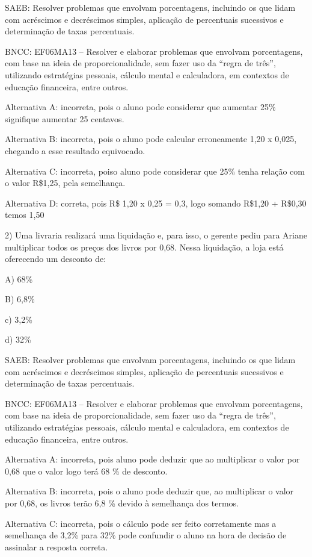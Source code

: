SAEB: Resolver problemas que envolvam porcentagens, incluindo os que
lidam com acréscimos e decréscimos simples, aplicação de percentuais
sucessivos e determinação de taxas percentuais.

BNCC: EF06MA13 -- Resolver e elaborar problemas que envolvam
porcentagens, com base na ideia de proporcionalidade, sem fazer uso da
``regra de três'', utilizando estratégias pessoais, cálculo mental e
calculadora, em contextos de educação financeira, entre outros.

Alternativa A: incorreta, pois o aluno pode considerar que aumentar 25\%
signifique aumentar 25 centavos.

Alternativa B: incorreta, pois o aluno pode calcular erroneamente 1,20 x
0,025, chegando a esse resultado equivocado.

Alternativa C: incorreta, poiso aluno pode considerar que 25\% tenha
relação com o valor R\$1,25, pela semelhança.

Alternativa D: correta, pois R\$ 1,20 x 0,25 = 0,3, logo somando R\$1,20
+ R\$0,30 temos 1,50

2) Uma livraria realizará uma liquidação e, para isso, o gerente pediu
para Ariane multiplicar todos os preços dos livros por 0,68. Nessa
liquidação, a loja está oferecendo um desconto de:

A) 68\%

B) 6,8\%

c) 3,2\%

d) 32\%

SAEB: Resolver problemas que envolvam porcentagens, incluindo os que
lidam com acréscimos e decréscimos simples, aplicação de percentuais
sucessivos e determinação de taxas percentuais.

BNCC: EF06MA13 -- Resolver e elaborar problemas que envolvam
porcentagens, com base na ideia de proporcionalidade, sem fazer uso da
``regra de três'', utilizando estratégias pessoais, cálculo mental e
calculadora, em contextos de educação financeira, entre outros.

Alternativa A: incorreta, pois aluno pode deduzir que ao multiplicar o
valor por 0,68 que o valor logo terá 68 \% de desconto.

Alternativa B: incorreta, pois o aluno pode deduzir que, ao multiplicar
o valor por 0,68, os livros terão 6,8 \% devido à semelhança dos termos.

Alternativa C: incorreta, pois o cálculo pode ser feito corretamente mas
a semelhança de 3,2\% para 32\% pode confundir o aluno na hora de
decisão de assinalar a resposta correta.

